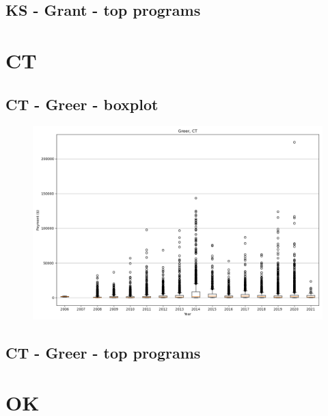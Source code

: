 \subsection*{KS - Grant - top programs}

\newpage
\section*{CT}
\subsection*{CT - Greer - boxplot}
\begin{figure}[h]
\centering
\includegraphics[width=7in]{../output/boxplots/counties/Greer-CT_boxplot.png}
\end{figure}


\subsection*{CT - Greer - top programs}

\newpage
\section*{OK}
